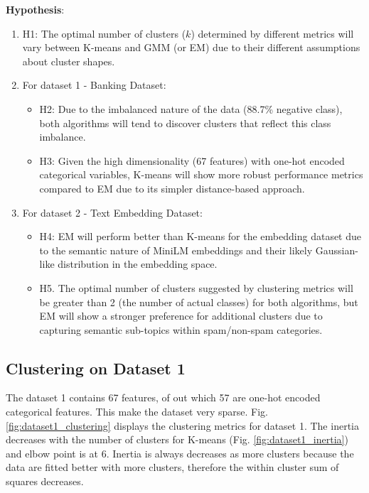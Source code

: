 \documentclass[conference]{IEEEtran}
\begin{document}
\textbf{Hypothesis}:
\begin{enumerate}
    \item H1: The optimal number of clusters ($k$) determined by different metrics will vary between K-means and GMM (or EM) due to their different assumptions about cluster shapes.
    \item For dataset 1 - Banking Dataset:
    \begin{itemize}
        \item H2: Due to the imbalanced nature of the data (88.7\% negative class), both algorithms will tend to discover clusters that reflect this class imbalance.
        \item H3: Given the high dimensionality (67 features) with one-hot encoded categorical variables, K-means will show more robust performance metrics compared to EM due to its simpler distance-based approach.

    \end{itemize}
    \item For dataset 2 - Text Embedding Dataset:
    \begin{itemize}
        \item H4: EM will perform better than K-means for the embedding dataset due to the semantic nature of MiniLM embeddings and their likely Gaussian-like distribution in the embedding space.
        \item H5. The optimal number of clusters suggested by clustering metrics will be greater than 2 (the number of actual classes) for both algorithms, but EM will show a stronger preference for additional clusters due to capturing semantic sub-topics within spam/non-spam categories.
    \end{itemize}
\end{enumerate}
\subsection{Clustering on Dataset 1}
The dataset 1 contains 67 features, of out which 57 are one-hot encoded categorical features. This make the dataset very sparse. Fig. \ref{fig:dataset1_clustering} displays the clustering metrics for dataset 1. The inertia decreases with the number of clusters for K-means (Fig. \ref{fig:dataset1_inertia}) and elbow point is at 6. Inertia is always decreases as more clusters because the data are fitted better with more clusters, therefore the within cluster sum of squares decreases. 
\end{document}
